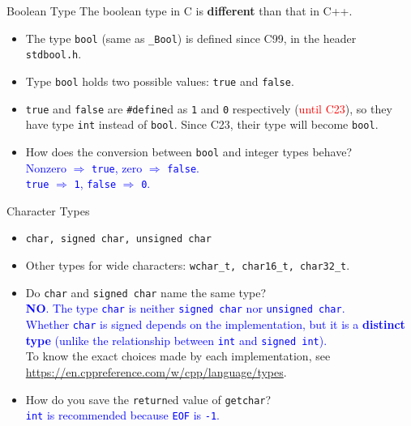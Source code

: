 \documentclass{beamer}
\newcommand{\red}[1]{\textcolor{red}{#1}}
\newcommand{\blue}[1]{\textcolor{blue}{#1}}
\begin{document}
\begin{frame}{Boolean Type}
    The boolean type in C is \textbf{different} than that in C++.
    \begin{itemize}
        \item The type \texttt{bool} (same as \texttt{\_Bool}) is defined since C99, in the header \texttt{stdbool.h}.
        \pause
        \item Type \texttt{bool} holds two possible values: \texttt{true} and \texttt{false}.
        \item \texttt{true} and \texttt{false} are \texttt{\#define}d as \texttt{1} and \texttt{0} respectively (\red{until C23}), so they have type \texttt{int} instead of \texttt{bool}. Since C23, their type will become \texttt{bool}.
        \pause
        \item How does the conversion between \texttt{bool} and integer types behave?\\
        \pause
        \blue{Nonzero \(\Rightarrow\) \texttt{true}, zero \(\Rightarrow\) \texttt{false}.}\\
        \blue{\texttt{true} \(\Rightarrow\) \texttt{1}, \texttt{false} \(\Rightarrow\) \texttt{0}.}
    \end{itemize}
\end{frame}

\begin{frame}{Character Types}
    \begin{itemize}
        \item \texttt{char, signed char, unsigned char}
        \item Other types for wide characters: \texttt{wchar\_t, char16\_t, char32\_t}.
        \pause
        \item Do \texttt{char} and \texttt{signed char} name the same type?\\
        \pause
        \blue{\textbf{NO}. The type \texttt{char} is neither \texttt{signed char} nor \texttt{unsigned char}.}\\
        \blue{Whether \texttt{char} is signed depends on the implementation, but it is a \textbf{distinct type} (unlike the relationship between \texttt{int} and \texttt{signed int}).}\\
        \pause
        To know the exact choices made by each implementation, see \url{https://en.cppreference.com/w/cpp/language/types}.
        \pause
        \item How do you save the \texttt{return}ed value of \texttt{getchar}?\\
        \pause
        \blue{\texttt{int} is recommended because \texttt{EOF} is \texttt{-1}.}
    \end{itemize}
\end{frame}
\end{document}
